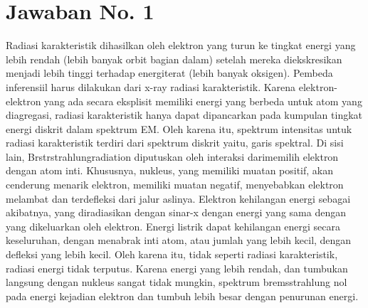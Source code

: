 \section{Jawaban No. 1}
Radiasi karakteristik dihasilkan oleh elektron yang turun ke tingkat energi yang lebih rendah (lebih banyak orbit bagian dalam) setelah mereka diekskresikan menjadi lebih tinggi terhadap energiterat (lebih banyak oksigen). Pembeda inferensiil harus dilakukan dari x-ray radiasi karakteristik. Karena elektron-elektron yang ada secara eksplisit memiliki energi yang berbeda untuk atom yang diagregasi, radiasi karakteristik hanya dapat dipancarkan pada kumpulan tingkat energi diskrit dalam spektrum EM. Oleh karena itu, spektrum intensitas untuk radiasi karakteristik terdiri dari spektrum diskrit yaitu, garis spektral. Di sisi lain, Brstrstrahlungradiation diputuskan oleh interaksi darimemilih elektron dengan atom inti. Khususnya, nukleus, yang memiliki muatan positif, akan cenderung menarik elektron, memiliki muatan negatif, menyebabkan elektron melambat dan terdefleksi dari jalur aslinya. Elektron kehilangan energi sebagai akibatnya, yang diradiasikan dengan sinar-x dengan energi yang sama dengan yang dikeluarkan oleh elektron. Energi listrik dapat kehilangan energi secara keseluruhan, dengan menabrak inti atom, atau jumlah yang lebih kecil, dengan defleksi yang lebih kecil. Oleh karena itu, tidak seperti radiasi karakteristik, radiasi energi tidak terputus. Karena energi yang lebih rendah, dan tumbukan langsung dengan nukleus sangat tidak mungkin, spektrum bremsstrahlung nol pada energi kejadian elektron dan tumbuh lebih besar dengan penurunan energi.


